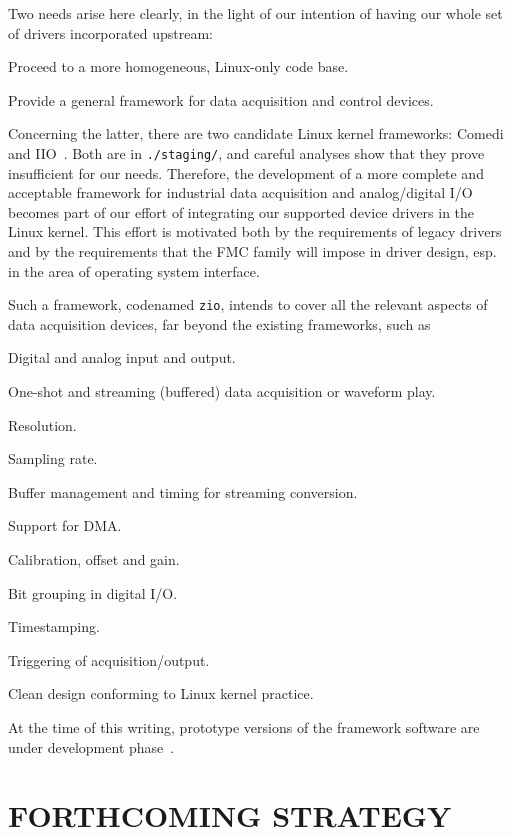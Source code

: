 \documentclass{JAC2003}
\begin{document}
Two needs arise here clearly, in the light of our intention of having our
whole set of drivers incorporated upstream:
\begin{Itemize}
\item Proceed to a more homogeneous, Linux-only code base.
\item Provide a general framework for data acquisition and control
    devices.
\end{Itemize}
Concerning the latter, there are two candidate Linux kernel frameworks:
Comedi~\cite{comedi} and IIO~\cite{iio}. Both are in \texttt{./staging/}, and
careful analyses show that they prove insufficient for our needs. Therefore,
the development of a more complete and acceptable framework for industrial data
acquisition and analog/digital I/O becomes part of our effort of integrating
our supported device drivers in the Linux kernel. This effort is motivated
both by the requirements of legacy drivers and by the requirements that
the FMC family will impose in driver design, esp. in the area of operating
system interface.

Such a framework, codenamed \texttt{zio}, intends to cover all the relevant
aspects of data acquisition devices, far beyond the existing frameworks,
such as
\begin{Itemize}
\item Digital and analog input and output.
\item One-shot and streaming (buffered) data acquisition or waveform play.
\item Resolution.
\item Sampling rate.
\item Buffer management and timing for streaming conversion.
\item Support for DMA.
\item Calibration, offset and gain.
\item Bit grouping in digital I/O.
\item Timestamping.
\item Triggering of acquisition/output.
\item Clean design conforming to Linux kernel practice.
\end{Itemize}
At the time of this writing, prototype versions of the framework software
are under development phase~\cite{zio-git}.

\section{FORTHCOMING STRATEGY}
\end{document}
